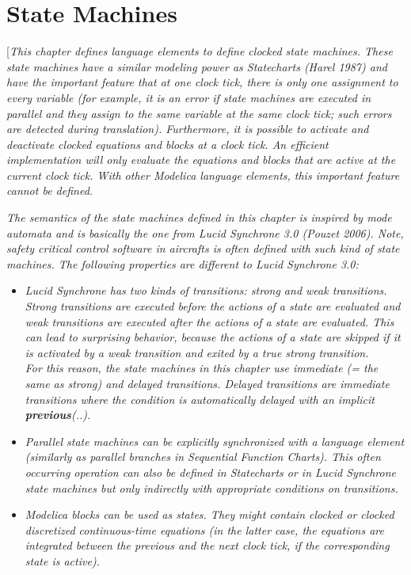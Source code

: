 \chapter{State Machines}

{[}\emph{This chapter defines language elements to define clocked state
machines. These state machines have a similar modeling power as
Statecharts (Harel 1987) and have the important feature that at one
clock tick, there is only one assignment to every variable (for example,
it is an error if state machines are executed in parallel and they
assign to the same variable at the same clock tick; such errors are
detected during translation). Furthermore, it is possible to activate
and deactivate clocked equations and blocks at a clock tick. An
efficient implementation will only evaluate the equations and blocks
that are active at the current clock tick. With other Modelica language
elements, this important feature cannot be defined.}

\emph{The semantics of the state machines defined in this chapter is
inspired by mode automata and is basically the one from Lucid Synchrone
3.0 (Pouzet 2006). Note, safety critical control software in aircrafts
is often defined with such kind of state machines. The following
properties are different to Lucid Synchrone 3.0:}

\begin{itemize}
\item
  \emph{Lucid Synchrone has two kinds of transitions: \emph{strong} and
  \emph{weak} transitions. Strong transitions are executed before the
  actions of a state are evaluated and weak transitions are executed
  after the actions of a state are evaluated. This can lead to
  surprising behavior, because the actions of a state are skipped if it
  is activated by a weak transition and exited by a true strong
  transition.\\
  For this reason, the state machines in this chapter use \emph{immediate}
  (= the same as \emph{strong}) and \emph{delayed} transitions. Delayed
  transitions are \emph{immediate} transitions where the condition is
  automatically delayed with an implicit \textbf{previous}(..). }
\item
  \emph{Parallel state machines can be explicitly synchronized with a
  language element (similarly as parallel branches in Sequential
  Function Charts). This often occurring operation can also be defined
  in Statecharts or in Lucid Synchrone state machines but only
  indirectly with appropriate conditions on transitions.}
\item
  \emph{Modelica blocks can be used as states. They might contain
  clocked or clocked discretized continuous-time equations (in the
  latter case, the equations are integrated between the previous and the
  next clock tick, if the corresponding state is active).}
\end{itemize}

